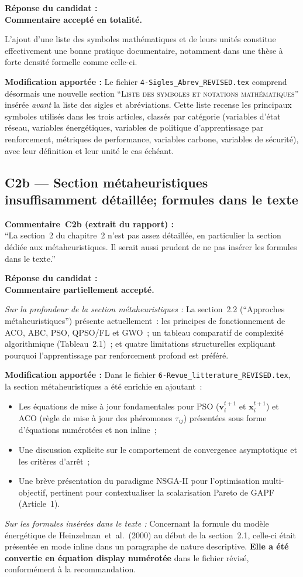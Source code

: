 \documentclass[12pt,a4paper]{article}
\newcommand{\Commentaire}[2]{%
  \begin{reviewerbox}
    \textbf{Commentaire~#1 (extrait du rapport) :}\\#2
  \end{reviewerbox}%
}
\newcommand{\Reponse}[1]{%
  \begin{responsebox}
    \textbf{Réponse du candidat :}\\#1
  \end{responsebox}%
}
\begin{document}
\Reponse{
\textbf{Commentaire accepté en totalité.}

L'ajout d'une liste des symboles mathématiques et de leurs unités constitue effectivement une bonne pratique documentaire, notamment dans une thèse à forte densité formelle comme celle-ci.

\textbf{Modification apportée :} Le fichier \texttt{4-Sigles\_Abrev\_REVISED.tex} comprend désormais une nouvelle section ``\textsc{Liste des symboles et notations mathématiques}'' insérée \emph{avant} la liste des sigles et abréviations. Cette liste recense les principaux symboles utilisés dans les trois articles, classés par catégorie (variables d'état réseau, variables énergétiques, variables de politique d'apprentissage par renforcement, métriques de performance, variables carbone, variables de sécurité), avec leur définition et leur unité le cas échéant.
}

\subsection*{C2b --- Section métaheuristiques insuffisamment détaillée; formules dans le texte}

\Commentaire{C2b}{
  ``La section~2 du chapitre~2 n'est pas assez détaillée, en particulier la section dédiée aux
  métaheuristiques. Il serait aussi prudent de ne pas insérer les formules dans le texte.''
}

\Reponse{
\textbf{Commentaire partiellement accepté.}

\textit{Sur la profondeur de la section métaheuristiques :}
La section~2.2 (``Approches métaheuristiques'') présente actuellement~: les principes de fonctionnement de ACO, ABC, PSO, QPSO/FL et GWO~; un tableau comparatif de complexité algorithmique (Tableau~2.1)~; et quatre limitations structurelles expliquant pourquoi l'apprentissage par renforcement profond est préféré.

\textbf{Modification apportée :} Dans le fichier \texttt{6-Revue\_litterature\_REVISED.tex}, la section métaheuristiques a été enrichie en ajoutant~:
\begin{itemize}[leftmargin=*]
  \item Les équations de mise à jour fondamentales pour PSO ($\mathbf{v}_i^{t+1}$ et $\mathbf{x}_i^{t+1}$) et ACO (règle de mise à jour des phéromones $\tau_{ij}$) présentées sous forme d'équations numérotées et non inline~;
  \item Une discussion explicite sur le comportement de convergence asymptotique et les critères d'arrêt~;
  \item Une brève présentation du paradigme NSGA-II pour l'optimisation multi-objectif, pertinent pour contextualiser la scalarisation Pareto de GAPF (Article~1).
\end{itemize}

\textit{Sur les formules insérées dans le texte :}
Concernant la formule du modèle énergétique de Heinzelman~et~al.\ (2000) au début de la section~2.1, celle-ci était présentée en mode inline dans un paragraphe de nature descriptive. \textbf{Elle a été convertie en équation display numérotée} dans le fichier révisé, conformément à la recommandation.
}
\end{document}
